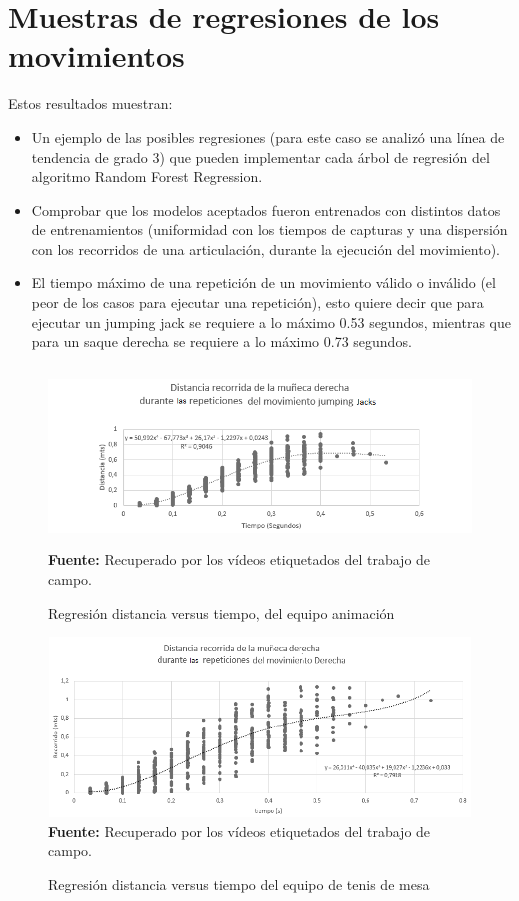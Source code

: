 \section{Muestras de regresiones de los movimientos} \label{res:regretions}
Estos resultados muestran:
\begin{itemize}
\item  Un ejemplo de las posibles regresiones (para este caso se analiz\'o una l\'inea de tendencia de grado 3) que pueden implementar cada \'arbol de regresi\'on del algoritmo Random Forest Regression.
\item  Comprobar que los modelos aceptados fueron entrenados con distintos datos de entrenamientos (uniformidad con los tiempos de capturas y una dispersi\'on con los recorridos de una articulaci\'on, durante la ejecuci\'on del  movimiento).
\item  El tiempo m\'aximo de una repetici\'on de un movimiento v\'alido o inv\'alido (el peor de los casos para ejecutar una repetici\'on), esto quiere  decir que para ejecutar un jumping jack se requiere a lo m\'aximo 0.53 segundos, mientras que para un saque derecha se requiere a lo m\'aximo 0.73 segundos.
\end{itemize}

\begin{figure}[H]
	\caption{Regresi\'on distancia versus tiempo, del equipo animaci\'on}
	\label{fig:regrCheerleader}
	\centering
	\includegraphics[width=445px,height=180px]{graphics/resultados/cluster-cheerleaders.PNG} \\
	\textbf{Fuente:} Recuperado por los v\'ideos etiquetados del trabajo de campo.
\end{figure}
\begin{figure}[H]
	\caption{Regresi\'on distancia versus tiempo  del equipo de tenis de mesa}
	\label{fig:regrTennisDeMesa}
	\centering
	\includegraphics[width=445px,height=180px]{graphics/resultados/cluster-tennis.PNG} \\
	\textbf{Fuente:} Recuperado por los v\'ideos etiquetados del trabajo de campo.
\end{figure}
